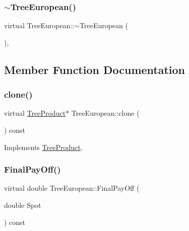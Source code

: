 \subsubsection{\texorpdfstring{$\sim$\+Tree\+European()}{~TreeEuropean()}}
{\footnotesize\ttfamily virtual Tree\+European\+::$\sim$\+Tree\+European (\begin{DoxyParamCaption}{ }\end{DoxyParamCaption})\hspace{0.3cm}{\ttfamily [inline]}, {\ttfamily [virtual]}}



\subsection{Member Function Documentation}
\hypertarget{classTreeEuropean_acf540b1c3082da0853905f252bf9d773}{}\label{classTreeEuropean_acf540b1c3082da0853905f252bf9d773} 
\subsubsection{\texorpdfstring{clone()}{clone()}}
{\footnotesize\ttfamily virtual \hyperlink{classTreeProduct}{Tree\+Product}$\ast$ Tree\+European\+::clone (\begin{DoxyParamCaption}{ }\end{DoxyParamCaption}) const\hspace{0.3cm}{\ttfamily [virtual]}}



Implements \hyperlink{classTreeProduct_a38edda2bee3c7203e94511df96a18c32}{Tree\+Product}.

\hypertarget{classTreeEuropean_aaffa40394d1021120a87dfa8e176c321}{}\label{classTreeEuropean_aaffa40394d1021120a87dfa8e176c321} 
\subsubsection{\texorpdfstring{Final\+Pay\+Off()}{FinalPayOff()}}
{\footnotesize\ttfamily virtual double Tree\+European\+::\+Final\+Pay\+Off (\begin{DoxyParamCaption}\item[{double}]{Spot }\end{DoxyParamCaption}) const\hspace{0.3cm}{\ttfamily [virtual]}}



